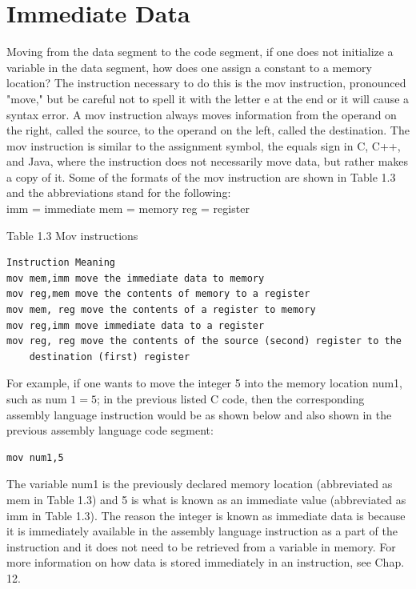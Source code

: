 \documentclass[10pt]{book}
\begin{document}
\section{Immediate Data}
Moving from the data segment to the code segment, if one does not initialize a variable in the data segment, how does one assign a constant to a memory location? The instruction necessary to do this is the mov instruction, pronounced "move," but be careful not to spell it with the letter e at the end or it will cause a syntax error. A mov instruction always moves information from the operand on the right, called the source, to the operand on the left, called the destination. The mov instruction is similar to the assignment symbol, the equals sign in C, C++, and Java, where the instruction does not necessarily move data, but rather makes a copy of it. Some of the formats of the mov instruction are shown in Table 1.3 and the abbreviations stand for the following:\\
imm = immediate mem = memory reg = register

Table 1.3 Mov instructions

\begin{verbatim}
Instruction Meaning
mov mem,imm move the immediate data to memory
mov reg,mem move the contents of memory to a register
mov mem, reg move the contents of a register to memory
mov reg,imm move immediate data to a register
mov reg, reg move the contents of the source (second) register to the
    destination (first) register
\end{verbatim}

For example, if one wants to move the integer 5 into the memory location num1, such as num $1=5$; in the previous listed C code, then the corresponding assembly language instruction would be as shown below and also shown in the previous assembly language code segment:

\begin{verbatim}
mov num1,5
\end{verbatim}

The variable num1 is the previously declared memory location (abbreviated as mem in Table 1.3) and 5 is what is known as an immediate value (abbreviated as imm in Table 1.3). The reason the integer is known as immediate data is because it is immediately available in the assembly language instruction as a part of the instruction and it does not need to be retrieved from a variable in memory. For more information on how data is stored immediately in an instruction, see Chap. 12.
\end{document}
